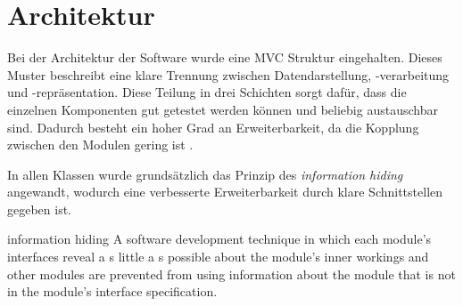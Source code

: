 
\section{Architektur}
\label{sec:architektur}
Bei der Architektur der Software wurde eine \gls{MVC} Struktur eingehalten. Dieses Muster beschreibt eine klare Trennung zwischen Datendarstellung, -verarbeitung und -repräsentation. Diese Teilung in drei Schichten sorgt dafür, dass die einzelnen Komponenten gut getestet werden können und beliebig austauschbar sind. Dadurch besteht ein hoher Grad an Erweiterbarkeit, da die Kopplung zwischen den Modulen gering ist \cite[S.~413]{ludewig}.

In allen Klassen wurde grundsätzlich das Prinzip des \textit{information hiding} angewandt, wodurch eine verbesserte Erweiterbarkeit durch klare Schnittstellen gegeben ist.

\begin{ieee}{information hiding}
A software development technique in which each module's interfaces reveal a s little a s possible about the module's inner workings and other modules are prevented from using information about the module that is not in the module's interface specification.
\end{ieee}


